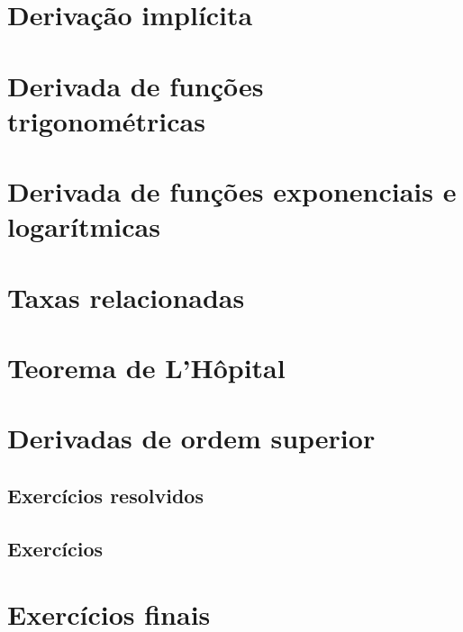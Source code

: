 \section{Derivação implícita}
\construirSec

\section{Derivada de funções trigonométricas}
\construirSec

\section{Derivada de funções exponenciais e logarítmicas}
\construirSec

\section{Taxas relacionadas}
\construirSec

\section{Teorema de L'Hôpital}
\construirSec

\section{Derivadas de ordem superior}
\construirSec



\subsection*{Exercícios resolvidos}

\construirExeresol

\subsection*{Exercícios}

\construirExer

\section{Exercícios finais}

\construirExer

